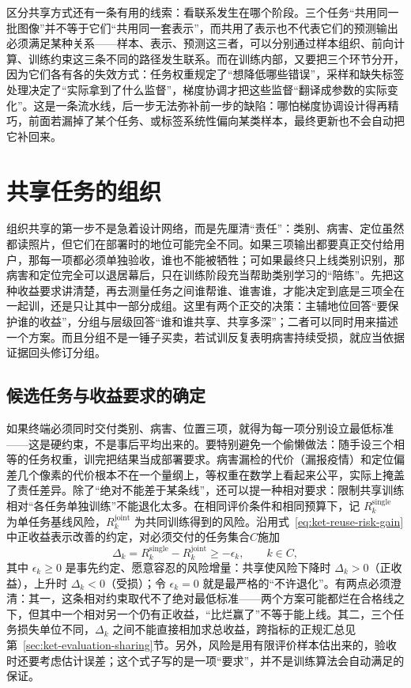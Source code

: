 区分共享方式还有一条有用的线索：看联系发生在哪个阶段。三个任务“共用同一批图像”并不等于它们“共用同一套表示”，而共用了表示也不代表它们的预测输出必须满足某种关系——样本、表示、预测这三者，可以分别通过样本组织、前向计算、训练约束这三条不同的路径发生联系。而在训练内部，又要把三个环节分开，因为它们各有各的失效方式：任务权重规定了“想降低哪些错误”，采样和缺失标签处理决定了“实际拿到了什么监督”，梯度协调才把这些监督“翻译成参数的实际变化”。这是一条流水线，后一步无法弥补前一步的缺陷：哪怕梯度协调设计得再精巧，前面若漏掉了某个任务、或标签系统性偏向某类样本，最终更新也不会自动把它补回来。

\section{共享任务的组织}
\label{sec:ket-sharing-organization}

组织共享的第一步不是急着设计网络，而是先厘清“责任”：类别、病害、定位虽然都读照片，但它们在部署时的地位可能完全不同。如果三项输出都要真正交付给用户，那每一项都必须单独验收，谁也不能被牺牲；可如果最终只上线类别识别，那病害和定位完全可以退居幕后，只在训练阶段充当帮助类别学习的“陪练”。先把这种收益要求讲清楚，再去测量任务之间谁帮谁、谁害谁，才能决定到底是三项全在一起训，还是只让其中一部分成组。这里有两个正交的决策：主辅地位回答“要保护谁的收益”，分组与层级回答“谁和谁共享、共享多深”；二者可以同时用来描述一个方案。而且分组不是一锤子买卖，若试训反复表明病害持续受损，就应当依据证据回头修订分组。

\subsection{候选任务与收益要求的确定}
\label{sec:ket-sharing-candidates}

如果终端必须同时交付类别、病害、位置三项，就得为每一项分别设立最低标准——这是硬约束，不是事后平均出来的。要特别避免一个偷懒做法：随手设三个相等的任务权重，训完把结果当成部署要求。病害漏检的代价（漏报疫情）和定位偏差几个像素的代价根本不在一个量纲上，等权重在数学上看起来公平，实际上掩盖了责任差异。除了“绝对不能差于某条线”，还可以提一种相对要求：限制共享训练相对“各任务单独训练”不能退化太多。在相同评价条件和相同预算下，记 $R_k^{\mathrm{single}}$ 为单任务基线风险，$R_k^{\mathrm{joint}}$ 为共同训练得到的风险。沿用式~\eqref{eq:ket-reuse-risk-gain}中正收益表示改善的约定，对必须交付的任务集合$C$施加
\begin{equation}
  \Delta_k=R_k^{\mathrm{single}}-R_k^{\mathrm{joint}}
  \geq-\epsilon_k,
  \qquad k\in C,
  \label{eq:ket-sharing-benefit-constraint}
\end{equation}
其中 $\epsilon_k\geq0$ 是事先约定、愿意容忍的风险增量：共享使风险下降时 $\Delta_k>0$（正收益），上升时 $\Delta_k<0$（受损）；令 $\epsilon_k=0$ 就是最严格的“不许退化”。有两点必须澄清：其一，这条相对约束取代不了绝对最低标准——两个方案可能都烂在合格线之下，但其中一个相对另一个仍有正收益，“比烂赢了”不等于能上线。其二，三个任务损失单位不同，$\Delta_k$ 之间不能直接相加求总收益，跨指标的正规汇总见第~\ref{sec:ket-evaluation-sharing}节。另外，风险是用有限评价样本估出来的，验收时还要考虑估计误差；这个式子写的是一项“要求”，并不是训练算法会自动满足的保证。

